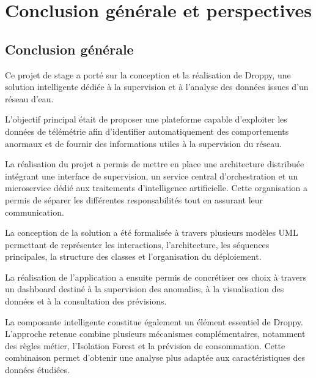 
\chapter{Conclusion générale et perspectives}


\section{Conclusion générale}

Ce projet de stage a porté sur la conception et la réalisation de Droppy,
une solution intelligente dédiée à la supervision et à l'analyse des données
issues d'un réseau d'eau.

L'objectif principal était de proposer une plateforme capable d'exploiter
les données de télémétrie afin d'identifier automatiquement des comportements
anormaux et de fournir des informations utiles à la supervision du réseau.

La réalisation du projet a permis de mettre en place une architecture
distribuée intégrant une interface de supervision, un service central
d'orchestration et un microservice dédié aux traitements d'intelligence
artificielle. Cette organisation a permis de séparer les différentes
responsabilités tout en assurant leur communication.

La conception de la solution a été formalisée à travers plusieurs modèles
UML permettant de représenter les interactions, l'architecture, les
séquences principales, la structure des classes et l'organisation du
déploiement.

La réalisation de l'application a ensuite permis de concrétiser ces choix
à travers un dashboard destiné à la supervision des anomalies, à la
visualisation des données et à la consultation des prévisions.

La composante intelligente constitue également un élément essentiel de
Droppy. L'approche retenue combine plusieurs mécanismes complémentaires,
notamment des règles métier, l'Isolation Forest et la prévision de
consommation. Cette combinaison permet d'obtenir une analyse plus adaptée
aux caractéristiques des données étudiées.

